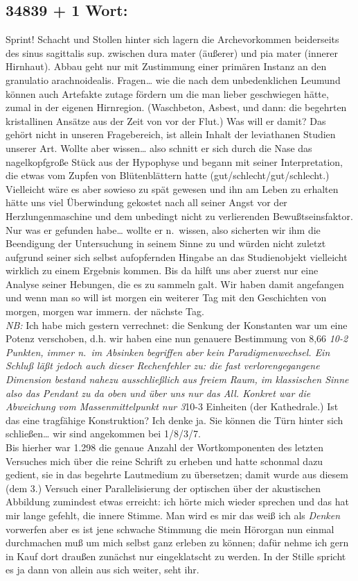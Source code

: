 \documentclass[
]{article}
\author{}
\date{\vspace{-2.5em}}
\begin{document}
\subsection{34839 + 1 Wort:}\label{wort}

Sprint! Schacht und Stollen hinter sich lagern die Archevorkommen
beiderseits des sinus sagittalis sup. zwischen dura mater (äußerer) und
pia mater (innerer Hirnhaut). Abbau geht nur mit Zustimmung einer
primären Instanz an den granulatio arachnoidealis. Fragen\ldots{} wie
die nach dem unbedenklichen Leumund können auch Artefakte zutage fördern
um die man lieber geschwiegen hätte, zumal in der eigenen Hirnregion.
(Waschbeton, Asbest, und dann: die begehrten kristallinen Ansätze aus
der Zeit von vor der Flut.) Was will er damit? Das gehört nicht in
unseren Fragebereich, ist allein Inhalt der leviathanen Studien unserer
Art. Wollte aber wissen\ldots{} also schnitt er sich durch die Nase das
nagelkopfgroße Stück aus der Hypophyse und begann mit seiner
Interpretation, die etwas vom Zupfen von Blütenblättern hatte
(gut/schlecht/gut/schlecht.) Vielleicht wäre es aber sowieso zu spät
gewesen und ihn am Leben zu erhalten hätte uns viel Überwindung gekostet
nach all seiner Angst vor der Herzlungenmaschine und dem unbedingt nicht
zu verlierenden Bewußtseinsfaktor. Nur was er gefunden habe\ldots{}
wollte er n.~wissen, also sicherten wir ihm die Beendigung der
Untersuchung in seinem Sinne zu und würden nicht zuletzt aufgrund seiner
sich selbst aufopfernden Hingabe an das Studienobjekt vielleicht
wirklich zu einem Ergebnis kommen. Bis da hilft uns aber zuerst nur eine
Analyse seiner Hebungen, die es zu sammeln galt. Wir haben damit
angefangen und wenn man so will ist morgen ein weiterer Tag mit den
Geschichten von morgen, morgen war immern. der nächste Tag.\\
\emph{NB:} Ich habe mich gestern verrechnet: die Senkung der Konstanten
war um eine Potenz verschoben, d.h. wir haben eine nun genauere
Bestimmung von 8,66 \emph{10-2 Punkten, immer n.~im Absinken begriffen
aber kein Paradigmenwechsel. Ein Schluß läßt jedoch auch dieser
Rechenfehler zu: die fast verlorengegangene Dimension bestand nahezu
ausschließlich aus freiem Raum, im klassischen Sinne also das Pendant zu
da oben und über uns nur das All. Konkret war die Abweichung vom
Massenmittelpunkt nur 3}10-3 Einheiten (der Kathedrale.) Ist das eine
tragfähige Konstruktion? Ich denke ja. Sie können die Türn hinter sich
schließen\ldots{} wir sind angekommen bei 1/8/3/7.\\
Bis hierher war 1.298 die genaue Anzahl der Wortkomponenten des letzten
Versuches mich über die reine Schrift zu erheben und hatte schonmal dazu
gedient, sie in das begehrte Lautmedium zu übersetzen; damit wurde aus
diesem (dem 3.) Versuch einer Parallelisierung der optischen über der
akustischen Abbildung zumindest etwas erreicht: ich hörte mich wieder
sprechen und das hat mir lange gefehlt, die innere Stimme. Man wird es
mir das weiß ich als \emph{Denken} vorwerfen aber es ist jene schwache
Stimmung die mein Hörorgan nun einmal durchmachen muß um mich selbst
ganz erleben zu können; dafür nehme ich gern in Kauf dort draußen
zunächst nur eingeklatscht zu werden. In der Stille spricht es ja dann
von allein aus sich weiter, seht ihr.
\end{document}
